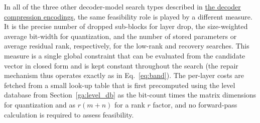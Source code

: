 In all of the three other decoder-model search types described in \hyperref[sec:decoder_compression_encodings]{the decoder compression encodings}, the same feasibility role is played by a different measure. It is the precise number of dropped sub-blocks for layer drop, the size-weighted average bit-width for quantization, and the number of stored parameters or average residual rank, respectively, for the low-rank and recovery searches. This measure is a single global constraint that can be evaluated from the candidate vector in closed form and is kept constant throughout the search (the repair mechanism thus operates exactly as in Eq.~\ref{eq:band}). The per-layer costs are fetched from a small look-up table that is first precomputed using the level database from Section~\ref{ga:level_db} as the bit-count times the matrix dimensions for quantization and as $r(m+n)$ for a rank $r$ factor, and no forward-pass calculation is required to assess feasibility.
